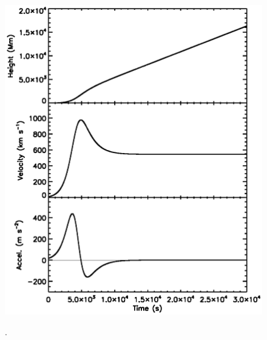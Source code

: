 \documentclass[preprint2]{aastex}
\begin{document}
\begin{figure}[ht]
\centering
{\includegraphics[scale=0.55, trim=20 50 0 50, clip=true]{images/model_kins.eps}}
\caption{.}
\label{model_kins}
\end{figure}
\end{document}
